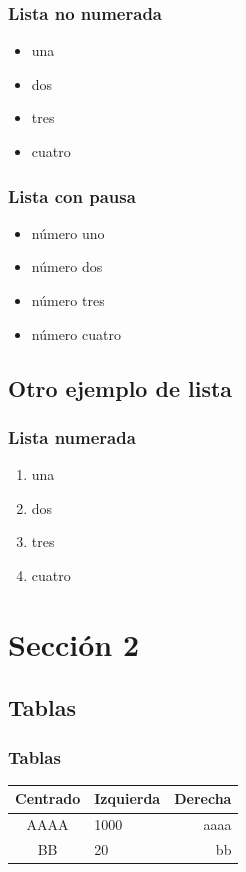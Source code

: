 \documentclass{beamer}
\begin{document}
\begin{frame}
\frametitle{Lista no numerada}
\begin{itemize}
\item una  
\item dos 
\item tres 
\item cuatro
\end{itemize} 
\end{frame}

\begin{frame}
\frametitle{Lista con pausa}
\begin{itemize}
\item número uno \pause 
\item número dos \pause 
\item número tres \pause 
\item número cuatro
\end{itemize} 
\end{frame}

\subsection{Otro ejemplo de lista}
\begin{frame}
\frametitle{Lista numerada}
\begin{enumerate}
\item una  
\item dos 
\item tres 
\item cuatro
\end{enumerate}
\end{frame}

\section{Sección 2} 
\subsection{Tablas}

\begin{frame}
\frametitle{Tablas}
\begin{tabular}{|c|l|r|} \hline
\textbf{Centrado} & \textbf{Izquierda} & \textbf{Derecha} \\ \hline
AAAA  & 1000 & aaaa \\ \hline
BB    & 20   & bb \\ \hline
\end{tabular}
\end{frame}
\end{document}
